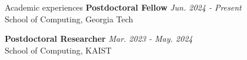 \begin{rSection}{Academic experiences}
\textbf{Postdoctoral Fellow} \hfill {\em Jun. 2024 - Present} \\
  School of Computing, Georgia Tech

\textbf{Postdoctoral Researcher} \hfill {\em Mar. 2023 - May. 2024} \\
  School of Computing, KAIST
\end{rSection}

